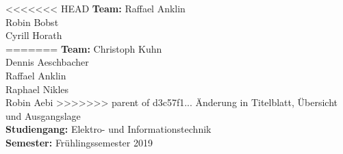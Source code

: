 \documentclass[final]{fhnwreport}       %
\begin{document}
\begin{center}
\begin{normalsize}
{\begin{tabbing}
					
<<<<<<< HEAD
					\textbf{Team:} \>Raffael Anklin \\ \>Robin Bobst \\ \>Cyrill Horath \\ 
=======
					\textbf{Team:} \>Christoph Kuhn \\ \>Dennis Aeschbacher \\ \>Raffael Anklin \\ \>Raphael Nikles \\ \>Robin Aebi
>>>>>>> parent of d3c57f1... Änderung in Titelblatt, Übersicht und Ausgangslage
					\\[0.8cm]
					\textbf{Studiengang:} \>Elektro- und Informationstechnik
					\\[0.8cm]	\textbf{Semester:} \>Frühlingssemester 2019
			\end{tabbing}}
		\end{normalsize}
		\vfill
	\end{center}
\clearpage


\tableofcontents
\clearpage


	
	
	
\pagebreak


\pagebreak


\pagebreak


\pagebreak


\pagebreak


\pagebreak




\clearpage
{\sloppypar
\printbibliography
\label{sec:lit}
}



{%
}
\end{document}
